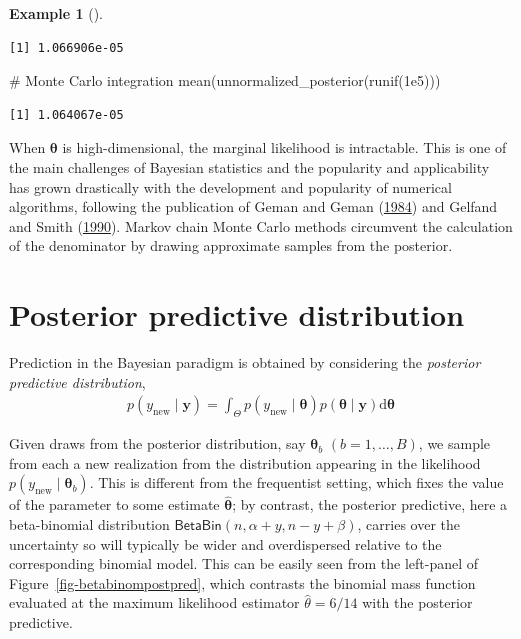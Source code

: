 \documentclass[
  11pt,
  letterpaper,
]{scrbook}
\newenvironment{Shaded}{\begin{snugshade}}{\end{snugshade}}
\newcommand{\CommentTok}[1]{\textcolor[rgb]{0.37,0.37,0.37}{#1}}
\newcommand{\FloatTok}[1]{\textcolor[rgb]{0.68,0.00,0.00}{#1}}
\newcommand{\FunctionTok}[1]{\textcolor[rgb]{0.28,0.35,0.67}{#1}}
\newcommand{\NormalTok}[1]{\textcolor[rgb]{0.00,0.23,0.31}{#1}}
\theoremstyle{definition}
\newtheorem{example}{Example}[chapter]
\theoremstyle{definition}
\theoremstyle{definition}
\theoremstyle{plain}
\theoremstyle{remark}
\begin{document}
\begin{example}[]
\begin{verbatim}
[1] 1.066906e-05
\end{verbatim}

\begin{Shaded}
\begin{Highlighting}[]
\CommentTok{\# Monte Carlo integration}
\FunctionTok{mean}\NormalTok{(}\FunctionTok{unnormalized\_posterior}\NormalTok{(}\FunctionTok{runif}\NormalTok{(}\FloatTok{1e5}\NormalTok{)))}
\end{Highlighting}
\end{Shaded}

\begin{verbatim}
[1] 1.064067e-05
\end{verbatim}

\end{example}

When \(\boldsymbol{\theta}\) is high-dimensional, the marginal
likelihood is intractable. This is one of the main challenges of
Bayesian statistics and the popularity and applicability has grown
drastically with the development and popularity of numerical algorithms,
following the publication of Geman and Geman
(\protect\hyperlink{ref-Geman.Geman:1984}{1984}) and Gelfand and Smith
(\protect\hyperlink{ref-Gelfand.Smith:1990}{1990}). Markov chain Monte
Carlo methods circumvent the calculation of the denominator by drawing
approximate samples from the posterior.

\hypertarget{posterior-predictive-distribution}{%
\section{Posterior predictive
distribution}\label{posterior-predictive-distribution}}

Prediction in the Bayesian paradigm is obtained by considering the
\emph{posterior predictive distribution}, \begin{align*}
p(y_{\text{new}} \mid \boldsymbol{y}) =
\int_{\Theta} p(y_{\text{new}}  \mid \boldsymbol{\theta}) p(\boldsymbol{\theta} \mid  \boldsymbol{y}) \mathrm{d} \boldsymbol{\theta}
\end{align*}

Given draws from the posterior distribution, say
\(\boldsymbol{\theta}_b\) \((b=1, \ldots, B)\), we sample from each a
new realization from the distribution appearing in the likelihood
\(p(y_{\text{new}} \mid \boldsymbol{\theta}_b)\). This is different from
the frequentist setting, which fixes the value of the parameter to some
estimate \(\widehat{\boldsymbol{\theta}}\); by contrast, the posterior
predictive, here a beta-binomial distribution
\(\mathsf{BetaBin}(n, \alpha + y, n - y + \beta)\), carries over the
uncertainty so will typically be wider and overdispersed relative to the
corresponding binomial model. This can be easily seen from the
left-panel of Figure~\ref{fig-betabinompostpred}, which contrasts the
binomial mass function evaluated at the maximum likelihood estimator
\(\widehat{\theta}=6/14\) with the posterior predictive.
\end{document}
